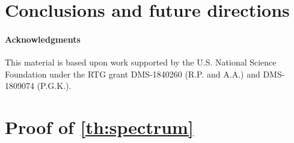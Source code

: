 \documentclass[12pt,reqno]{amsart}
\theoremstyle{definition}
\begin{document}
\section{Conclusions and future directions}

\paragraph{\textbf{Acknowledgments}}

This material is based upon work supported by the U.S. National Science Foundation under the RTG grant DMS-1840260 (R.P. and A.A.)
and DMS-1809074 (P.G.K.).

\appendix

\section{Proof of \texorpdfstring{\cref{th:spectrum}}{Theorem 2} }\label{app:specproof}
\end{document}

